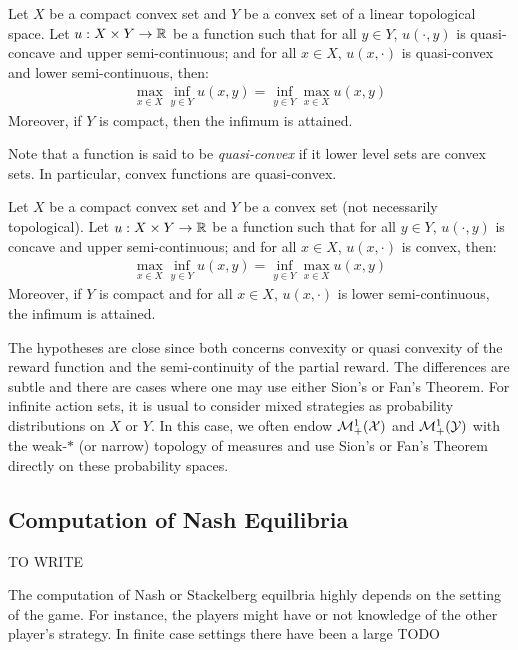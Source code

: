 \begin{thm}
Let $X$ be a compact convex set and $Y$ be a convex set of a linear topological space. Let $u:X\times Y\to\mathbb{R}$ be a function such that for all $y\in Y$, $u(\cdot,y)$ is quasi-concave and upper semi-continuous; and for all $x\in X$, $u(x,\cdot)$ is quasi-convex and lower semi-continuous, then:
\begin{align*}
    \max_{x\in X}\inf_{y\in Y} u(x,y) = \inf_{y\in Y}\max_{x\in X} u(x,y)
\end{align*}
Moreover, if $Y$ is compact, then the infimum is attained.
\end{thm}

Note that a function is said to be \emph{quasi-convex} if it lower level sets are convex sets. In particular, convex functions are quasi-convex. 
\begin{thm}
Let $X$ be a compact convex set and $Y$ be a convex set (not necessarily topological). Let $u:X\times Y\to\mathbb{R}$ be a function such that for all $y\in Y$, $u(\cdot,y)$ is concave and upper semi-continuous; and for all $x\in X$, $u(x,\cdot)$ is convex, then:
\begin{align*}
    \max_{x\in X}\inf_{y\in Y} u(x,y) = \inf_{y\in Y}\max_{x\in X} u(x,y)
\end{align*}
Moreover, if $Y$ is compact and for all $x\in X$, $u(x,\cdot)$ is lower semi-continuous, the infimum is attained.
\end{thm}

The hypotheses are close since both concerns convexity or quasi convexity of the reward function and the semi-continuity of the partial reward. The differences are subtle and there are cases where one may use either Sion's or Fan's Theorem. For infinite action sets, it is usual to consider mixed strategies as probability distributions on $X$ or $Y$. In this case, we often endow $\mathcal{M}^1_+(\mathcal{X})$ and $\mathcal{M}^1_+(\mathcal{Y})$ with the weak-$*$ (or narrow) topology of measures and use Sion's or Fan's Theorem directly on these probability spaces.

\subsection{Computation of Nash Equilibria}

TO WRITE 

The computation of Nash or Stackelberg equilbria highly depends on the setting of the game. For instance, the players might have or not knowledge of the other player's strategy. In finite case settings there have been a large  TODO

